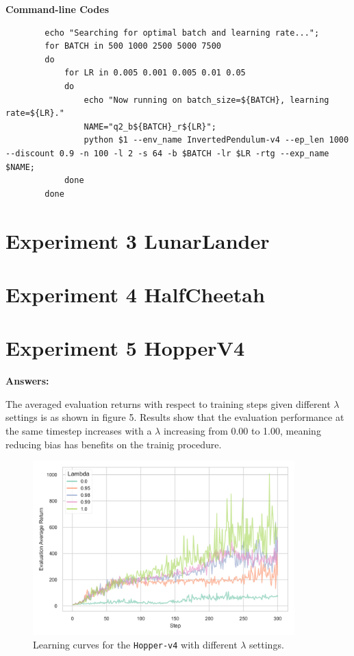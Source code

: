 \documentclass[10pt, letterpaper]{article}
\begin{document}
    \textbf{Command-line Codes}
    \begin{lstlisting}
        echo "Searching for optimal batch and learning rate...";
        for BATCH in 500 1000 2500 5000 7500 
        do
            for LR in 0.005 0.001 0.005 0.01 0.05
            do
                echo "Now running on batch_size=${BATCH}, learning rate=${LR}."
                NAME="q2_b${BATCH}_r${LR}";
                python $1 --env_name InvertedPendulum-v4 --ep_len 1000 --discount 0.9 -n 100 -l 2 -s 64 -b $BATCH -lr $LR -rtg --exp_name $NAME;
            done
        done
    \end{lstlisting}

    \newpage
    \section*{Experiment 3 LunarLander}

    \newpage
    \section*{Experiment 4 HalfCheetah}

    \newpage
    \section*{Experiment 5 HopperV4}

    \textbf{Answers:}

    The averaged evaluation returns with respect to training steps given different $\lambda$ settings is as shown in figure 5. Results show that the evaluation performance at the same timestep increases with a $\lambda$ increasing from 0.00 to 1.00, meaning reducing bias has benefits on the trainig procedure.

    \begin{figure}[thbp]
       \centering
       \includegraphics[width=0.9\textwidth]{exp_05.png} 
       \caption{Learning curves for the \texttt{Hopper-v4} with different $\lambda$ settings.}
       \label{fig:5}
    \end{figure}
\end{document}
